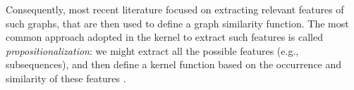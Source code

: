 Consequently, most recent literature focused on extracting relevant features of such graphs, that are then used to define a graph similarity function. The most common approach adopted in the kernel to extract such features is called \textit{propositionalization}: we might extract all the possible features (e.g., subsequences), and then define a kernel function based on the occurrence and similarity of these features \cite{Gartner03}.

%
%
%
%
%
%
